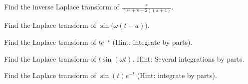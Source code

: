 \documentclass{ximera}
\begin{document}
\begin{exercise}
    Find the inverse Laplace transform of $\frac{s}{(s^2+s+2)(s+4)}$.
\end{exercise}

\begin{exercise}
    Find the Laplace transform of $\sin\bigl(\omega (t-a)\bigr)$.
\end{exercise}

\begin{exercise}
    Find the Laplace transform of $te^{-t}$ (Hint: integrate by parts).
\end{exercise}

\begin{exercise}
    Find the Laplace transform of $t\sin(\omega t)$.  Hint: Several integrations by parts.
\end{exercise}


\begin{exercise}
    Find the Laplace transform of $\sin(t)e^{-t}$ (Hint: integrate by parts).
\end{exercise}


\end{document}
